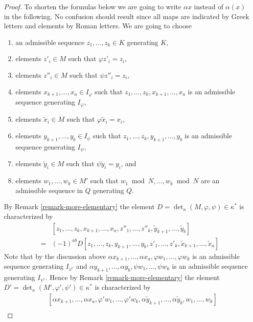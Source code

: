\documentclass[10pt,a4paper]{amsart}
\theoremstyle{plain}
\theoremstyle{definition}
\theoremstyle{remark}
\numberwithin{equation}{subsection}
\begin{document}
\begin{proof}
\medskip\noindent
To shorten the formulas below we are going to write $\alpha x$ instead
of $\alpha(x)$ in the following. No confusion should result since
all maps are indicated by Greek letters and elements by Roman letters.
We are going to choose
\begin{enumerate}
\item an admissible sequence $z_1, \ldots, z_k \in K$
generating $K$,
\item elements $z'_i \in M$ such that $\varphi z'_i = z_i$,
\item elements $z''_i \in M$ such that $\psi z''_i = z_i$,
\item elements $x_{k + 1}, \ldots, x_a \in I_\varphi$ such
that $z_1, \ldots, z_k, x_{k + 1}, \ldots, x_a$ is an admissible
sequence generating $I_\varphi$,
\item elements $\tilde x_i \in M$ such that $\varphi \tilde x_i = x_i$,
\item elements $y_{k + 1}, \ldots, y_b \in I_\psi$ such that
$z_1, \ldots, z_k, y_{k + 1}, \ldots, y_b$ is an admissible
sequence generating $I_\psi$,
\item elements $\tilde y_i \in M$ such that $\psi \tilde y_i = y_i$, and
\item elements $w_1, \ldots, w_k \in M'$ such that
$w_1 \bmod N, \ldots, w_k \bmod N$ are an admissible sequence
in $Q$ generating $Q$.
\end{enumerate}
By Remark \ref{remark-more-elementary} the element
$D = \det_\kappa(M, \varphi, \psi) \in \kappa^*$ is
characterized by
\begin{eqnarray*}
& &
[z_1, \ldots, z_k,
x_{k + 1}, \ldots, x_a,
z''_1, \ldots, z''_k,
\tilde y_{k + 1}, \ldots, \tilde y_b] \\
& = &
(-1)^{ab} D
[z_1, \ldots, z_k,
y_{k + 1}, \ldots, y_b,
z'_1, \ldots, z'_k,
\tilde x_{k + 1}, \ldots, \tilde x_a]
\end{eqnarray*}
Note that by the discussion above
$\alpha x_{k + 1}, \ldots, \alpha x_a, \varphi w_1, \ldots, \varphi w_k$
is an admissible sequence generating $I_{\varphi'}$ and
$\alpha y_{k + 1}, \ldots, \alpha y_b, \psi w_1, \ldots, \psi w_k$
is an admissible sequence generating $I_{\psi'}$.
Hence by Remark \ref{remark-more-elementary} the element
$D' = \det_\kappa(M', \varphi', \psi') \in \kappa^*$ is
characterized by
\begin{eqnarray*}
& &
[\alpha x_{k + 1}, \ldots, \alpha x_a,
\varphi' w_1, \ldots, \varphi' w_k,
\alpha \tilde y_{k + 1}, \ldots, \alpha \tilde y_b,
w_1, \ldots, w_k]
\\

\end{eqnarray*}
\end{proof}
\end{document}
